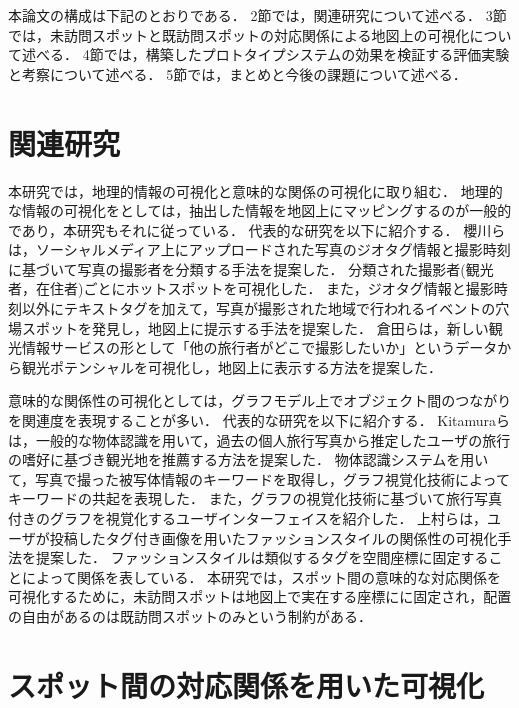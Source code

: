 \documentclass{deimj}
\begin{document}
本論文の構成は下記のとおりである．
2節では，関連研究について述べる．
3節では，未訪問スポットと既訪問スポットの対応関係による地図上の可視化について述べる．
4節では，構築したプロトタイプシステムの効果を検証する評価実験と考察について述べる．
5節では，まとめと今後の課題について述べる．


\section{関連研究}
本研究では，地理的情報の可視化と意味的な関係の可視化に取り組む．
地理的な情報の可視化をとしては，抽出した情報を地図上にマッピングするのが一般的であり，本研究もそれに従っている．
代表的な研究を以下に紹介する．
櫻川ら\cite{櫻川2015}は，ソーシャルメディア上にアップロードされた写真のジオタグ情報と撮影時刻に基づいて写真の撮影者を分類する手法を提案した．
分類された撮影者(観光者，在住者)ごとにホットスポットを可視化した．
また，ジオタグ情報と撮影時刻以外にテキストタグを加えて，写真が撮影された地域で行われるイベントの穴場スポットを発見し，地図上に提示する手法を提案した\cite{櫻川2016}．
倉田ら\cite{倉田}は，新しい観光情報サービスの形として「他の旅行者がどこで撮影したいか」というデータから観光ポテンシャルを可視化し，地図上に表示する方法を提案した．

意味的な関係性の可視化としては，グラフモデル上でオブジェクト間のつながりを関連度を表現することが多い．
代表的な研究を以下に紹介する．
Kitamuraら\cite{Kitamura}は，一般的な物体認識を用いて，過去の個人旅行写真から推定したユーザの旅行の嗜好に基づき観光地を推薦する方法を提案した．
物体認識システムを用いて，写真で撮った被写体情報のキーワードを取得し，グラフ視覚化技術によってキーワードの共起を表現した．
また，グラフの視覚化技術に基づいて旅行写真付きのグラフを視覚化するユーザインターフェイスを紹介した．
上村ら\cite{上村}は，ユーザが投稿したタグ付き画像を用いたファッションスタイルの関係性の可視化手法を提案した．
ファッションスタイルは類似するタグを空間座標に固定することによって関係を表している．
本研究では，スポット間の意味的な対応関係を可視化するために，未訪問スポットは地図上で実在する座標にに固定され，配置の自由があるのは既訪問スポットのみという制約がある．

\section{スポット間の対応関係を用いた可視化}
\label{sec:未訪問スポットと既訪問スポットの対応関係を用いた可視化}
\end{document}
